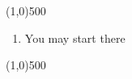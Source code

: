 


\fontsize{20}{24}
\line(1,0){500}
\fontsize{12}{15}
\begin{enumerate}
\item You may start there
\end{enumerate}
\line(1,0){500}

